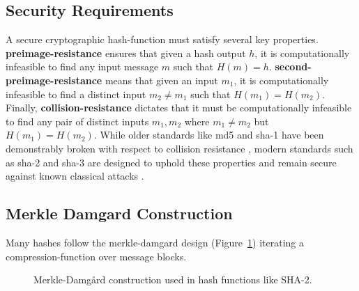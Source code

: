 \subsection{Security Requirements}
A secure cryptographic \gls{hash-function} must satisfy several key properties. \textbf{\gls{preimage-resistance}} ensures that given a hash output \(h\), it is computationally infeasible to find any input message \(m\) such that \(H(m) = h\). \textbf{\gls{second-preimage-resistance}} means that given an input \(m_1\), it is computationally infeasible to find a distinct input \(m_2 \neq m_1\) such that \(H(m_1) = H(m_2)\). Finally, \textbf{\gls{collision-resistance}} dictates that it must be computationally infeasible to find any pair of distinct inputs \(m_1, m_2\) where \(m_1 \neq m_2\) but \(H(m_1) = H(m_2)\). While older standards like \gls{md5} and \gls{sha-1} have been demonstrably broken with respect to collision resistance \parencite{wang2005finding}, modern standards such as \gls{sha-2} and \gls{sha-3} are designed to uphold these properties and remain secure against known classical attacks \parencite{nist_fips202, blake3}.
\newpage

\subsection{Merkle Damgard Construction}
Many hashes follow the \gls{merkle-damgard} design (Figure~\ref{fig:merkle_damgard_rev}) iterating a \gls{compression-function} over message blocks.

\begin{figure}[htb]
    \centering
    \caption{Merkle-Damgård construction used in hash functions like SHA-2.}
    \label{fig:merkle_damgard_rev}
\end{figure}


